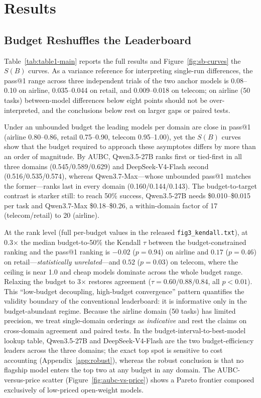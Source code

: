 \documentclass[preprint,authoryear,12pt]{elsarticle}
\begin{document}
\section{Results}
\label{sec:results}

\subsection{Budget Reshuffles the Leaderboard}
\label{subsec:budget-reshuffles}
Table~\ref{tab:table1-main} reports the full results and Figure~\ref{fig:sb-curves} the $S(B)$ curves. As a variance reference for interpreting single-run differences, the pass@1 range across three independent trials of the two anchor models is 0.08--0.10 on airline, 0.035--0.044 on retail, and 0.009--0.018 on telecom; on airline (50 tasks) between-model differences below eight points should not be over-interpreted, and the conclusions below rest on larger gaps or paired tests.

Under an unbounded budget the leading models per domain are close in pass@1 (airline 0.80--0.86, retail 0.75--0.90, telecom 0.95--1.00), yet the $S(B)$ curves show that the budget required to approach these asymptotes differs by more than an order of magnitude. By AUBC, Qwen3.5-27B ranks first or tied-first in all three domains (0.545/0.589/0.629) and DeepSeek-V4-Flash second (0.516/0.535/0.574), whereas Qwen3.7-Max---whose unbounded pass@1 matches the former---ranks last in every domain (0.160/0.144/0.143). The budget-to-target contrast is starker still: to reach 50\% success, Qwen3.5-27B needs \$0.010--\$0.015 per task and Qwen3.7-Max \$0.18--\$0.26, a within-domain factor of 17 (telecom/retail) to 20 (airline).

At the rank level (full per-budget values in the released \texttt{fig3\_kendall.txt}), at 0.3$\times$ the median budget-to-50\% the Kendall $\tau$ between the budget-constrained ranking and the pass@1 ranking is $-0.02$ ($p=0.94$) on airline and $0.17$ ($p=0.46$) on retail---\emph{statistically unrelated}---and $0.52$ ($p=0.03$) on telecom, where the ceiling is near 1.0 and cheap models dominate across the whole budget range. Relaxing the budget to 3$\times$ restores agreement ($\tau=0.60/0.88/0.84$, all $p<0.01$). This ``low-budget decoupling, high-budget convergence'' pattern quantifies the validity boundary of the conventional leaderboard: it is informative only in the budget-abundant regime. Because the airline domain (50 tasks) has limited precision, we treat single-domain orderings as \emph{indicative} and rest the claims on cross-domain agreement and paired tests. In the budget-interval-to-best-model lookup table, Qwen3.5-27B and DeepSeek-V4-Flash are the two budget-efficiency leaders across the three domains; the exact top spot is sensitive to cost accounting (Appendix~\ref{app:robust}), whereas the robust conclusion is that no flagship model enters the top two at any budget in any domain. The AUBC-versus-price scatter (Figure~\ref{fig:aubc-vs-price}) shows a Pareto frontier composed exclusively of low-priced open-weight models.
\end{document}
